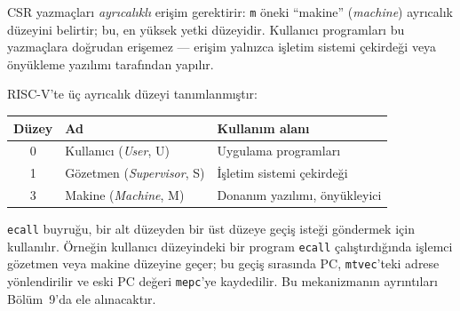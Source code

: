 CSR yazmaçları \emph{ayrıcalıklı} erişim gerektirir: \texttt{m} öneki ``makine'' (\emph{machine}) ayrıcalık düzeyini belirtir; bu, en yüksek yetki düzeyidir. Kullanıcı programları bu yazmaçlara doğrudan erişemez --- erişim yalnızca işletim sistemi çekirdeği veya önyükleme yazılımı tarafından yapılır.

RISC-V'te üç ayrıcalık düzeyi tanımlanmıştır:

\begin{center}
\small
\begin{tabular}{cll}
\toprule
Düzey & Ad & Kullanım alanı \\
\midrule
0 & Kullanıcı (\emph{User}, U) & Uygulama programları \\
1 & Gözetmen (\emph{Supervisor}, S) & İşletim sistemi çekirdeği \\
3 & Makine (\emph{Machine}, M) & Donanım yazılımı, önyükleyici \\
\bottomrule
\end{tabular}
\end{center}

\texttt{ecall} buyruğu, bir alt düzeyden bir üst düzeye geçiş isteği göndermek için kullanılır. Örneğin kullanıcı düzeyindeki bir program \texttt{ecall} çalıştırdığında işlemci gözetmen veya makine düzeyine geçer; bu geçiş sırasında PC, \texttt{mtvec}'teki adrese yönlendirilir ve eski PC değeri \texttt{mepc}'ye kaydedilir. Bu mekanizmanın ayrıntıları Bölüm~9'da ele alınacaktır.

